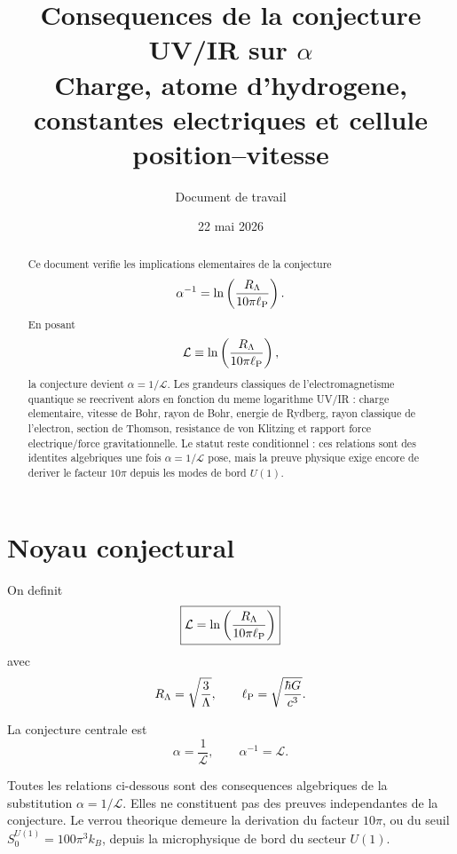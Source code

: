 \documentclass[11pt,a4paper]{article}
\title{Consequences de la conjecture UV/IR sur $\alpha$\\
\large Charge, atome d'hydrogene, constantes electriques et cellule position--vitesse}
\author{Document de travail}
\date{22 mai 2026}
\newcommand{\cL}{\mathcal L}
\newcommand{\lp}{\ell_{\rm P}}
\newcommand{\RL}{R_{\Lambda}}
\begin{document}
\maketitle

\begin{abstract}
Ce document verifie les implications elementaires de la conjecture
\[
\alpha^{-1}=\ln\left(\frac{R_{\Lambda}}{10\pi\ell_{\rm P}}\right).
\]
En posant
\[
\mathcal L\equiv\ln\left(\frac{R_\Lambda}{10\pi\ell_{\rm P}}\right),
\]
la conjecture devient \(\alpha=1/\mathcal L\). Les grandeurs classiques de
l'electromagnetisme quantique se reecrivent alors en fonction du meme
logarithme UV/IR : charge elementaire, vitesse de Bohr, rayon de Bohr, energie
de Rydberg, rayon classique de l'electron, section de Thomson, resistance de
von Klitzing et rapport force electrique/force gravitationnelle. Le statut
reste conditionnel : ces relations sont des identites algebriques une fois
\(\alpha=1/\mathcal L\) pose, mais la preuve physique exige encore de deriver
le facteur \(10\pi\) depuis les modes de bord \(U(1)\).
\end{abstract}

\tableofcontents
\newpage

\section{Noyau conjectural}

On definit
\begin{equation}
\boxed{
\cL=\ln\left(\frac{\RL}{10\pi\lp}\right)
}
\end{equation}
avec
\begin{equation}
\RL=\sqrt{\frac{3}{\Lambda}},
\qquad
\lp=\sqrt{\frac{\hbar G}{c^3}}.
\end{equation}

La conjecture centrale est
\begin{equation}
\boxed{\alpha=\frac{1}{\cL}},
\qquad
\boxed{\alpha^{-1}=\cL}.
\end{equation}

\begin{tcolorbox}[colback=blue!3!white,colframe=blue!50!black,title=Statut]
Toutes les relations ci-dessous sont des consequences algebriques de la
substitution \(\alpha=1/\cL\). Elles ne constituent pas des preuves
independantes de la conjecture. Le verrou theorique demeure la derivation du
facteur \(10\pi\), ou du seuil \(S_0^{U(1)}=100\pi^3 k_B\), depuis la
microphysique de bord du secteur \(U(1)\).
\end{tcolorbox}
\end{document}
